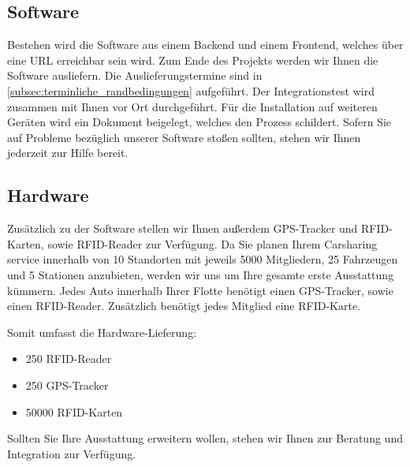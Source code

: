 \subsection{Software}
\label{subsec:6_software}

Bestehen wird die Software aus einem Backend und einem Frontend, welches über eine URL erreichbar sein wird.
Zum Ende des Projekts werden wir Ihnen die Software ausliefern.
Die Auslieferungstermine sind in \autoref{subsec:terminliche_randbedingungen} aufgeführt.
Der Integrationstest wird zusammen mit Ihnen vor Ort durchgeführt.
Für die Installation auf weiteren Geräten wird ein Dokument beigelegt, welches den Prozess schildert.
Sofern Sie auf Probleme bezüglich unserer Software stoßen sollten, stehen wir Ihnen jederzeit zur Hilfe bereit.

\subsection{Hardware}
\label{subsec:6_hardware}

Zusätzlich zu der Software stellen wir Ihnen außerdem GPS-Tracker und RFID-Karten, sowie RFID-Reader zur Verfügung.
Da Sie planen Ihrem Carsharing service innerhalb von 10 Standorten mit jeweils 5000 Mitgliedern, 25 Fahrzeugen und 5 Stationen
anzubieten, werden wir uns um Ihre gesamte erste Ausstattung kümmern.
Jedes Auto innerhalb Ihrer Flotte benötigt einen GPS-Tracker, sowie einen RFID-Reader.
Zusätzlich benötigt jedes Mitglied eine RFID-Karte.

\medskip
Somit umfasst die Hardware-Lieferung:
\begin{itemize}
    \item 250 RFID-Reader
    \item 250 GPS-Tracker
    \item 50000 RFID-Karten
\end{itemize}

Sollten Sie Ihre Ausstattung erweitern wollen, stehen wir Ihnen zur Beratung und Integration zur Verfügung.